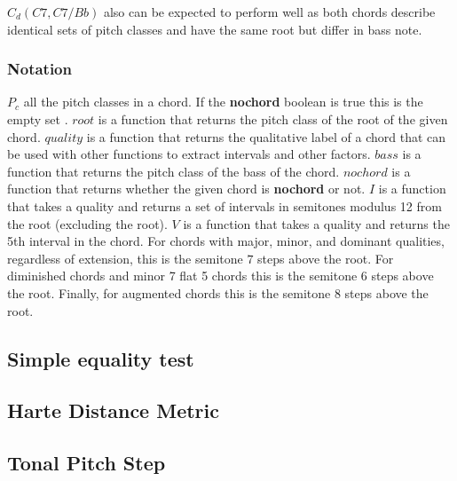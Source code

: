 $C_d(C7, C7/Bb)$ also can be expected to perform well as both chords describe identical sets of pitch classes and have the same root but differ in bass note.

\subsubsection{Notation}

$P_c$ all the pitch classes in a chord. If the \textbf{nochord} boolean is true this is the empty set ${}$.
$root$ is a function that returns the pitch class of the root of the given chord.
$quality$ is a function that returns the qualitative label of a chord that can be used with other functions to extract intervals and other factors.
$bass$ is a function that returns the pitch class of the bass of the chord.
$nochord$ is a function that returns whether the given chord is \textbf{nochord} or not.
$I$ is a function that takes a quality and returns a set of intervals in semitones modulus 12 from the root (excluding the root).
$V$ is a function that takes a quality and returns the 5th interval in the chord. For chords with major, minor, and dominant qualities, regardless of extension, this is the semitone $7$ steps above the root. For diminished chords and minor 7 flat 5 chords this is the semitone $6$ steps above the root. Finally, for augmented chords this is the semitone $8$ steps above the root.

\subsection{Simple equality test}

\subsection{Harte Distance Metric}

\subsection{Tonal Pitch Step}